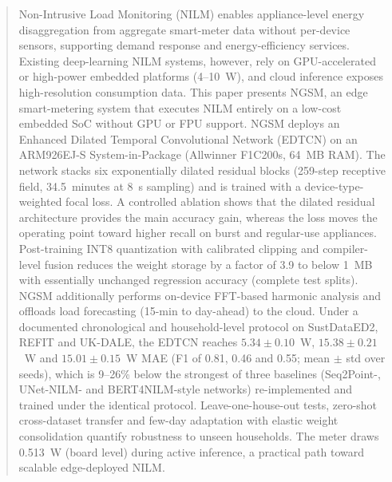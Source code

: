 \documentclass[fleqn,10pt]{wlscirep}
\begin{document}
\begin{abstract}
Non-Intrusive Load Monitoring (NILM) enables appliance-level energy disaggregation from aggregate smart-meter data without per-device sensors, supporting demand response and energy-efficiency services. Existing deep-learning NILM systems, however, rely on GPU-accelerated or high-power embedded platforms (4--10~W), and cloud inference exposes high-resolution consumption data. This paper presents NGSM, an edge smart-metering system that executes NILM entirely on a low-cost embedded SoC without GPU or FPU support. NGSM deploys an Enhanced Dilated Temporal Convolutional Network (EDTCN) on an ARM926EJ-S System-in-Package (Allwinner F1C200s, 64~MB RAM). The network stacks six exponentially dilated residual blocks (259-step receptive field, 34.5~minutes at 8~s sampling) and is trained with a device-type-weighted focal loss. A controlled ablation shows that the dilated residual architecture provides the main accuracy gain, whereas the loss moves the operating point toward higher recall on burst and regular-use appliances. Post-training INT8 quantization with calibrated clipping and compiler-level fusion reduces the weight storage by a factor of 3.9 to below 1~MB with essentially unchanged regression accuracy (complete test splits). NGSM additionally performs on-device FFT-based harmonic analysis and offloads load forecasting (15-min to day-ahead) to the cloud. Under a documented chronological and household-level protocol on SustDataED2, REFIT and UK-DALE, the EDTCN reaches $5.34\pm0.10$~W, $15.38\pm0.21$~W and $15.01\pm0.15$~W MAE (F1 of 0.81, 0.46 and 0.55; mean $\pm$ std over seeds), which is 9--26\% below the strongest of three baselines (Seq2Point-, UNet-NILM- and BERT4NILM-style networks) re-implemented and trained under the identical protocol. Leave-one-house-out tests, zero-shot cross-dataset transfer and few-day adaptation with elastic weight consolidation quantify robustness to unseen households. The meter draws 0.513~W (board level) during active inference, a practical path toward scalable edge-deployed NILM.
\end{abstract}
\maketitle
\end{document}
